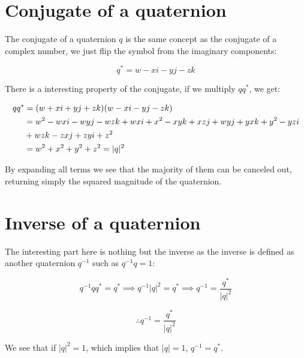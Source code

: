 \documentclass[12pt]{article}
\begin{document}
	\section{Conjugate of a quaternion}
	
	The conjugate of a quaternion $q$ is the same concept as the conjugate of a complex number, we just flip the symbol from the imaginary components:
	
	\[
		q^* = w - xi - yj - zk
	\]
	
	There is a interesting property of the conjugate, if we multiply $qq^*$, we get:
	
	\[
		\begin{aligned}
			& qq^* = (w + xi + yj + zk)(w - xi - yj - zk)
			\\
			& \hspace{1.4em} = w^2 - wxi - wyj - wzk + wxi + x^2 - xyk + xzj + wyj + yxk + y^2- yzi
			\\
			& \hspace{1.4em} + wzk - zxj + zyi + z^2
			\\
			& \hspace{1.4em} = w^2 + x^2 + y^2 + z^2 = |q|^2
		\end{aligned}
	\]
	
	By expanding all terms we see that the majority of them can be canceled out, returning simply the squared magnitude of the quaternion.
	
	\section{Inverse of a quaternion}
	
	The interesting part here is nothing but the inverse as the inverse is defined as another quaternion $q^{-1}$ such as $q^{-1}q = 1$:
	
	\[
		q^{-1}qq^* = q^* \implies q^{-1}|q|^2 = q^* \implies q^{-1} = \frac{q^*}{|q|^2}
	\]
	
	\[
		\therefore q^{-1} = \frac{q^*}{|q|^2}
	\]
	
	We see that if $|q|^2 = 1$, which implies that $|q| = 1$, $q^{-1} = q^*$.
	
\end{document}
